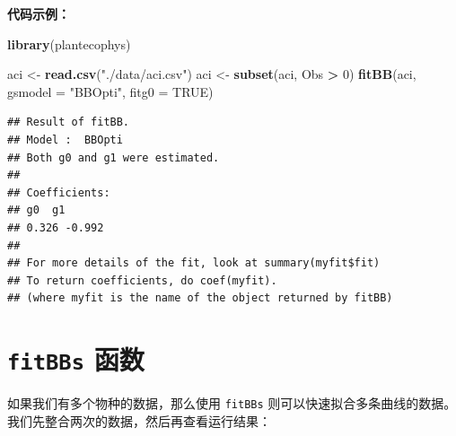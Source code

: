 \documentclass[]{krantz}
\makeatletter
\newenvironment{Shaded}{\begin{snugshade}}{\end{snugshade}}
\newcommand{\KeywordTok}[1]{\textcolor[rgb]{0.13,0.29,0.53}{\textbf{#1}}}
\newcommand{\DataTypeTok}[1]{\textcolor[rgb]{0.13,0.29,0.53}{#1}}
\newcommand{\DecValTok}[1]{\textcolor[rgb]{0.00,0.00,0.81}{#1}}
\newcommand{\StringTok}[1]{\textcolor[rgb]{0.31,0.60,0.02}{#1}}
\newcommand{\OtherTok}[1]{\textcolor[rgb]{0.56,0.35,0.01}{#1}}
\newcommand{\OperatorTok}[1]{\textcolor[rgb]{0.81,0.36,0.00}{\textbf{#1}}}
\newcommand{\NormalTok}[1]{#1}
\newenvironment{kframe}{%
\medskip{}
\setlength{\fboxsep}{.8em}
 \def\at@end@of@kframe{}%
 \ifinner\ifhmode%
  \def\at@end@of@kframe{\end{minipage}}%
  \begin{minipage}{\columnwidth}%
 \fi\fi%
 \def\FrameCommand##1{\hskip\@totalleftmargin \hskip-\fboxsep
 \colorbox{shadecolor}{##1}\hskip-\fboxsep
     \hskip-\linewidth \hskip-\@totalleftmargin \hskip\columnwidth}%
 \MakeFramed {\advance\hsize-\width
   \@totalleftmargin\z@ \linewidth\hsize
   \@setminipage}}%
 {\par\unskip\endMakeFramed%
 \at@end@of@kframe}
\renewenvironment{Shaded}{\begin{kframe}}{\end{kframe}}
\theoremstyle{definition}
\theoremstyle{definition}
\theoremstyle{definition}
\theoremstyle{remark}
\makeatother
\begin{document}
\textbf{代码示例：}

\begin{Shaded}
\begin{Highlighting}[]
\KeywordTok{library}\NormalTok{(plantecophys)}

\NormalTok{aci <-}\StringTok{ }\KeywordTok{read.csv}\NormalTok{(}\StringTok{"./data/aci.csv"}\NormalTok{)}
\NormalTok{aci <-}\StringTok{ }\KeywordTok{subset}\NormalTok{(aci, Obs }\OperatorTok{>}\StringTok{ }\DecValTok{0}\NormalTok{)}
\KeywordTok{fitBB}\NormalTok{(aci, }\DataTypeTok{gsmodel =} \StringTok{"BBOpti"}\NormalTok{, }\DataTypeTok{fitg0 =} \OtherTok{TRUE}\NormalTok{)}
\end{Highlighting}
\end{Shaded}

\begin{verbatim}
## Result of fitBB.
## Model :  BBOpti 
## Both g0 and g1 were estimated.
## 
## Coefficients:
## g0  g1
## 0.326 -0.992 
## 
## For more details of the fit, look at summary(myfit$fit)
## To return coefficients, do coef(myfit).
## (where myfit is the name of the object returned by fitBB)
\end{verbatim}

\section{\texorpdfstring{\texttt{fitBBs}
函数}{fitBBs 函数}}\label{fitbbs}

如果我们有多个物种的数据，那么使用 \texttt{fitBBs}
则可以快速拟合多条曲线的数据。我们先整合两次的数据，然后再查看运行结果：
\end{document}
